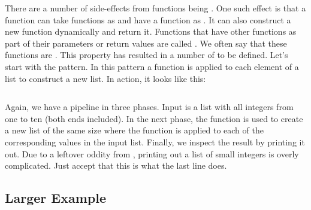 There are a number of side-effects from functions being . One such effect is that a function can take functions as  and have a function as . It can also construct a new function dynamically and return it. Functions that have other functions as part of their parameters or return values are called . We often say that these functions are . This property has resulted in a number of  to be defined. Let's start with the  pattern. In this pattern a function is applied to each element of a list to construct a new list. In action, it looks like this:

\inputminted[firstline=5]{elixir}{../src/elixir/functions/map/map.exs} %

Again, we have a pipeline in three phases. Input is a list with all integers from one to ten (both ends included). In the next phase, the  function is used to create a new list of the same size where the  function is applied to each of the corresponding values in the input list. Finally, we inspect the result by printing it out. Due to a leftover oddity from , printing out a list of small integers is overly complicated. Just accept that this is what the last line does.

\subsection{Larger Example}

